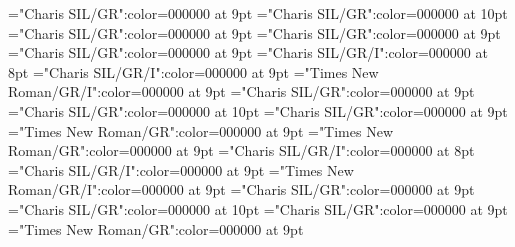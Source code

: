 \documentclass[gps1,twoside]{article}
\begin{document}
\font\spantexitemteLexSensepublishStemGlossPubLdtesensesensesentryletDatadicBody="Charis SIL/GR":color=000000 at 9pt
\font\xitemhiLexSensepublishStemGlossPubLdtesensesensesentryletDatadicBody="Charis SIL/GR":color=000000 at 10pt
\font\spanhixitemhiLexSensepublishStemGlossPubLdtesensesensesentryletDatadicBody="Charis SIL/GR":color=000000 at 9pt
\font\examplessensesensesentryletDatadicBody="Charis SIL/GR":color=000000 at 9pt
\font\xitemexamplessensesensesentryletDatadicBody="Charis SIL/GR":color=000000 at 9pt
\font\exampleggoTeluINxitemexamplessensesensesentryletDatadicBody="Charis SIL/GR/I":color=000000 at 8pt
\font\spanggoTeluINexampleggoTeluINxitemexamplessensesensesentryletDatadicBody="Charis SIL/GR/I":color=000000 at 9pt
\font\spanenexampleggoTeluINxitemexamplessensesensesentryletDatadicBody="Times New Roman/GR/I":color=000000 at 9pt
\font\translationsxitemexamplessensesensesentryletDatadicBody="Charis SIL/GR":color=000000 at 9pt
\font\translationLdtetranslationsxitemexamplessensesensesentryletDatadicBody="Charis SIL/GR":color=000000 at 10pt
\font\spantetranslationLdtetranslationsxitemexamplessensesensesentryletDatadicBody="Charis SIL/GR":color=000000 at 9pt
\font\spanentranslationLdtetranslationsxitemexamplessensesensesentryletDatadicBody="Times New Roman/GR":color=000000 at 9pt
\font\spanenexamplessensesensesentryletDatadicBody="Times New Roman/GR":color=000000 at 9pt
\font\exampleggoTeluINexamplessensesensesentryletDatadicBody="Charis SIL/GR/I":color=000000 at 8pt
\font\spanggoTeluINexampleggoTeluINexamplessensesensesentryletDatadicBody="Charis SIL/GR/I":color=000000 at 9pt
\font\spanenexampleggoTeluINexamplessensesensesentryletDatadicBody="Times New Roman/GR/I":color=000000 at 9pt
\font\translationsexamplessensesensesentryletDatadicBody="Charis SIL/GR":color=000000 at 9pt
\font\translationLdtetranslationsexamplessensesensesentryletDatadicBody="Charis SIL/GR":color=000000 at 10pt
\font\spantetranslationLdtetranslationsexamplessensesensesentryletDatadicBody="Charis SIL/GR":color=000000 at 9pt
\font\spanentranslationLdtetranslationsexamplessensesensesentryletDatadicBody="Times New Roman/GR":color=000000 at 9pt
\end{document}
